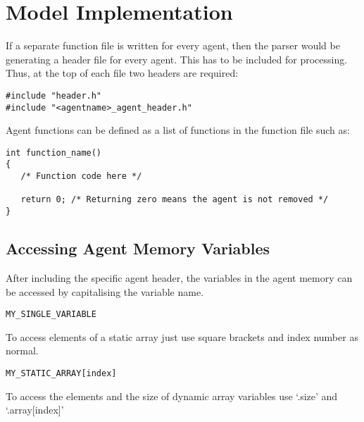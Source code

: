 \section{Model Implementation}
\label{model_implementation}

If a separate function file is written for every agent, then the
parser would be generating a header file for every agent. This has
to be included for processing. Thus, at the top of each file two
headers are required:

\begin{mylisting}
\begin{verbatim}
#include "header.h"
#include "<agentname>_agent_header.h"
\end{verbatim}
\end{mylisting}

Agent functions can be defined as a list of functions in the
function file such as:

\begin{mylisting}
\begin{verbatim}
int function_name()
{
   /* Function code here */

   return 0; /* Returning zero means the agent is not removed */
}
\end{verbatim}
\end{mylisting}

\subsection{Accessing Agent Memory Variables}

After including the specific agent header, the variables in the
agent memory can be accessed by capitalising the variable name.

\begin{mylisting}
\begin{verbatim}
MY_SINGLE_VARIABLE
\end{verbatim}
\end{mylisting}

To access elements of a static array just use square brackets and index number as normal.

\begin{mylisting}
\begin{verbatim}
MY_STATIC_ARRAY[index]
\end{verbatim}
\end{mylisting}

To access the elements and the size of dynamic array variables use
`.size' and `.array[index]'

